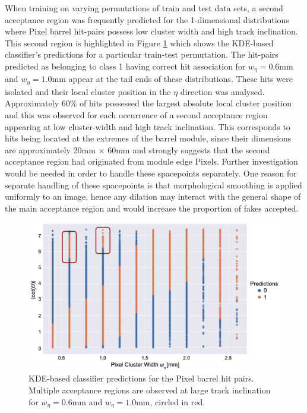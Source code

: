 When training on varying permutations of train and test data sets, a second acceptance region was frequently predicted for the 1-dimensional distributions where Pixel barrel hit-pairs possess low cluster width and high track inclination. This second region is highlighted in Figure \ref{fig:multiple-acceptance} which shows the KDE-based classifier's predictions for a particular train-test permutation. The hit-pairs predicted as belonging to class 1 having correct hit association for $w_{\eta} = 0.6$mm and $w_{\eta} = 1.0$mm appear at the tail ends of these distributions. These hits were isolated and their local cluster position in the $\eta$ direction was analysed. Approximately 60\% of hits possessed the largest absolute local cluster position and this was observed for each occurrence of a second acceptance region appearing at low cluster-width and high track inclination. This corresponds to hits being located at the extremes of the barrel module, since their dimensions are approximately 20mm $\times$ 60mm \cite{pixel-module-dimensions} and strongly suggests that the second acceptance region had originated from module edge Pixels. Further investigation would be needed in order to handle these spacepoints separately. One reason for separate handling of these spacepoints is that morphological smoothing is applied uniformly to an image, hence any dilation may interact with the general shape of the main acceptance region and would increase the proportion of fakes accepted.

\begin{figure}[!htbp]
\centering
\includegraphics[width=0.98\linewidth]{images/4-ml-based-predictor/Multiple_acceptance_regions.png}
\caption{KDE-based classifier predictions for the Pixel barrel hit pairs. Multiple acceptance regions are observed at large track inclination for $w_{\eta} = 0.6$mm and $w_{\eta} = 1.0$mm, circled in red.}
\label{fig:multiple-acceptance}
\end{figure}


